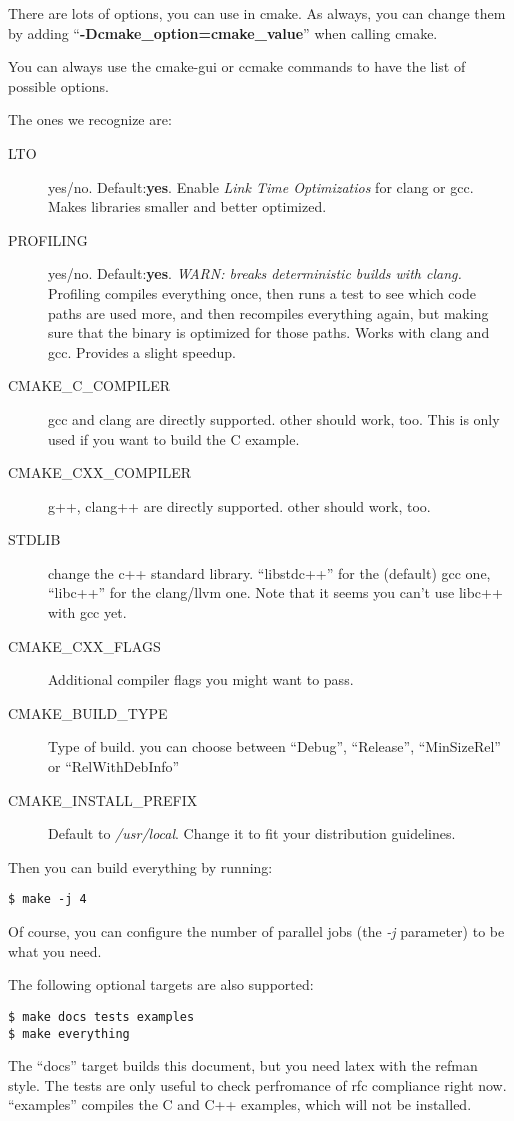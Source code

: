 \documentclass[11pt,a4paper]{refart}
\begin{document}
There are lots of options, you can use in cmake. As always, you can change them by adding ``\textbf{-Dcmake\_option=cmake\_value}'' when calling cmake.

You can always use the cmake-gui or ccmake commands to have the list of possible options.

The ones we recognize are:

\begin{description}
\item[LTO] yes/no. Default:\textbf{yes}. Enable \textit{Link Time Optimizatios} for clang or gcc. Makes libraries smaller and better optimized.
\item[PROFILING] yes/no. Default:\textbf{yes}. \textit{WARN: breaks deterministic builds with clang.}
Profiling compiles everything once, then runs a test to see which code paths are used more, and then
recompiles everything again, but making sure that the binary is optimized for those paths. Works with clang and gcc. Provides a slight speedup.
\item[CMAKE\_C\_COMPILER] gcc and clang are directly supported. other should work, too. This is only used if you want to build the C example.
\item[CMAKE\_CXX\_COMPILER] g++, clang++ are directly supported. other should work, too.
\item[STDLIB] change the c++ standard library. ``libstdc++'' for the (default) gcc one, ``libc++'' for the clang/llvm one. Note that it seems you can't use libc++ with gcc yet.
\item[CMAKE\_CXX\_FLAGS] Additional compiler flags you might want to pass.
\item[CMAKE\_BUILD\_TYPE] Type of build. you can choose between ``Debug'', ``Release'', ``MinSizeRel'' or ``RelWithDebInfo''
\item[CMAKE\_INSTALL\_PREFIX] Default to \textit{/usr/local}. Change it to fit your distribution guidelines.
\end{description}

Then you can build everything by running:
\begin{verbatim}
$ make -j 4
\end{verbatim}
Of course, you can configure the number of parallel jobs (the \textit{-j} parameter) to be what you need.

The following optional targets are also supported:
\begin{verbatim}
$ make docs tests examples
$ make everything
\end{verbatim}
The ``docs'' target builds this document, but you need latex with the refman style.
The tests are only useful to check perfromance of rfc compliance right now. ``examples'' compiles the C and C++ examples, which will not be installed.
\end{document}
